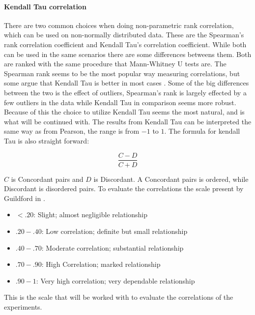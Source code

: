 \paragraph{Kendall Tau correlation}
There are two common choices when doing non-parametric rank correlation, which can be used on non-normally distributed data. These are the Spearman's rank correlation coefficient and Kendall Tau's correlation coefficient. While both can be used in the same scenarios there are some differences betweens them. Both are ranked with the same procedure that Mann-Whitney U tests are. The Spearman rank seems to be the most popular way measuring correlations, but some argue that Kendall Tau is better in most cases \cite{gilpin1993table}. Some of the big differences between the two is the effect of outliers, Spearman's rank is largely effected by a few outliers in the data while Kendall Tau in comparison seems more robust. Because of this the choice to utilize Kendall Tau seems the most natural, and is what will be continued with. The results from Kendall Tau can be interpreted the same way as from Pearson, the range is from $-1$ to $1$. The formula for kendall Tau is also straight forward:

\begin{equation}
    \frac{C-D}{C+D}
\end{equation}

$C$ is Concordant pairs and $D$ is Discordant. A Concordant pairs is ordered, while Discordant is disordered pairs\cite{kendall1938new}. To evaluate the correlations the scale present by Guildford in \cite[219]{guilford1950fundamental}.
\begin{itemize}
    \item $<.20$: Slight; almost negligible relationship
    \item $.20-.40$: Low correlation; definite but small relationship
    \item $.40-.70$: Moderate correlation; substantial relationship
    \item $.70-.90$: High Correlation; marked relationship
    \item $.90-1$: Very high correlation; very dependable relationship
\end{itemize}

This is the scale that will be worked with to evaluate the correlations of the experiments.

